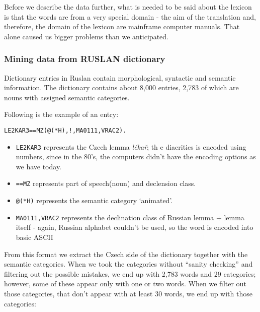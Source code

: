 \documentclass[letterpaper]{article}
\begin{document}
Before we describe the data further, what is needed to be said about the lexicon is 
that the words are from a very special domain - the aim of the translation 
and, therefore, the domain of the lexicon are mainframe computer manuals. 
That alone caused us bigger problems than we anticipated.

\subsubsection{Mining data from RUSLAN dictionary}

Dictionary entries in Ruslan contain morphological,
syntactic and semantic information. The dictionary contains about 8,000 entries, 2,783 of which are nouns
with assigned semantic categories.

Following is the example of an entry:

\begin{verbatim}
LE2KAR3==MZ(@(*H),!,MA0111,VRAC2).
\end{verbatim}

\begin{itemize}
\item \texttt{LE2KAR3} represents the Czech lemma \emph{lékař}; th
e diacritics is encoded using numbers, since in the 80's, the computers didn't have the encoding options as we have today.
\item \texttt{==MZ} represents part of speech(noun) and declension class.
\item \texttt{@(*H)} represents the semantic category `animated'.
\item \texttt{MA0111,VRAC2} represents the declination class of Russian lemma + lemma itself - 
again, Russian alphabet couldn't be used, so the word is encoded into basic ASCII
\end{itemize}

From this format we extract the Czech side of the dictionary together with the semantic categories. 
When we took the categories without ``sanity checking'' and filtering out the possible mistakes, 
we end up with 2,783 words and 29 categories; however, some of these appear only with one or two words. 
When we filter out those categories, that don't appear with at least 30 words, we end up with those categories:
\end{document}

